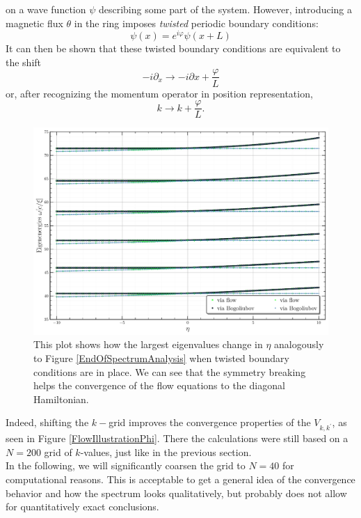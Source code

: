 on a wave function $\psi$ describing some part of the system. However, introducing a magnetic flux $\theta$ in the ring imposes \emph{twisted} periodic boundary conditions:
\begin{equation}
\psi(x)=e^{i\varphi}\psi(x+L)
\end{equation}
It can then be shown \cite{twisted} that these twisted boundary conditions are equivalent to the shift 
\begin{equation}
-i\partial_x\rightarrow -i\partial x+\frac{\varphi}{L}
\end{equation}
or, after recognizing the momentum operator in position representation, 
\begin{equation}
k\rightarrow k+\frac{\varphi}{L}.
\end{equation}
\begin{figure}[H]
    \centering
    \includegraphics[width=\textwidth]{figures/plots/PDF/Spectral_analysis,N=40.pdf}
    \caption[End of the spectrum of the Hamiltonian with twisted boundary conditions]{This plot shows how the largest eigenvalues change in $\eta$ analogously to Figure \ref{EndOfSpectrumAnalysis} when twisted boundary conditions are in place. We can see that the symmetry breaking helps the convergence of the flow equations to the diagonal Hamiltonian. }
    \label{ConvergenceImprovementsTwisted}
\end{figure}
Indeed, shifting the $k-$grid improves the convergence properties of the $V_{k,k^\prime}$, as seen in Figure \ref{FlowIllustrationPhi}. There the calculations were still based on a $N=200$ grid of $k$-values, just like in the previous section. \\
In the following, we will significantly coarsen the grid to $N=40$ for computational reasons. This is acceptable to get a general idea of the convergence behavior and how the spectrum looks qualitatively, but probably does not allow for quantitatively exact conclusions.
